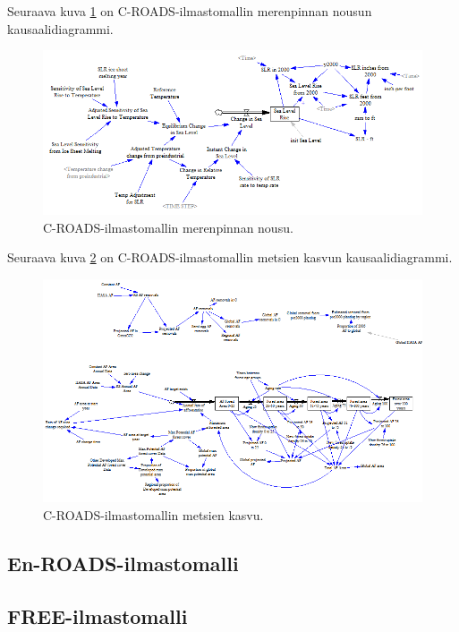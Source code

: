\documentclass[finnish,12pt,a4paper,pdftex]{article}
\begin{document}
\begin{onehalfspacing}
Seuraava kuva \ref{ilmasto:slr} on C-ROADS-ilmastomallin merenpinnan nousun kausaalidiagrammi. 

\begin{figure}[H]
\centering \includegraphics[width=\textwidth]{c-roads-slr}
\caption{C-ROADS-ilmastomallin merenpinnan nousu. \cite{Croads} \label{ilmasto:slr}}
\end{figure}

\clearpage

Seuraava kuva \ref{ilmasto:af} on C-ROADS-ilmastomallin metsien kasvun kausaalidiagrammi. 

\begin{figure}[H] %
\centering \includegraphics[width=\textwidth]{c-roads-af}
\caption{C-ROADS-ilmastomallin metsien kasvu. \cite{Croads} \label{ilmasto:af}}
\end{figure}

\subsection{En-ROADS-ilmastomalli \label{ilmasto:enroads}}

\subsection{FREE-ilmastomalli \label{ilmasto:free}}


\end{onehalfspacing}
\end{document}
